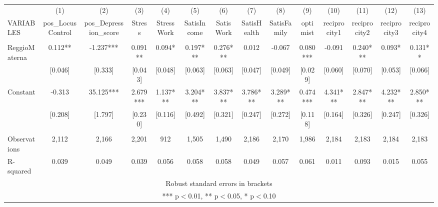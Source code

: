 \begin{tabular}{lccccccccccccc} \hline
 & (1) & (2) & (3) & (4) & (5) & (6) & (7) & (8) & (9) & (10) & (11) & (12) & (13) \\
VARIABLES & pos\_LocusControl & pos\_Depression\_score & Stress & StressWork & SatisIncome & SatisWork & SatisHealth & SatisFamily & optimist & reciprocity1 & reciprocity2 & reciprocity3 & reciprocity4 \\ \hline
 &  &  &  &  &  &  &  &  &  &  &  &  &  \\
ReggioMaterna & 0.112** & -1.237*** & 0.091** & 0.094* & 0.197*** & 0.276*** & 0.012 & -0.067 & 0.080*** & -0.091 & 0.240*** & 0.093* & 0.131** \\
 & [0.046] & [0.333] & [0.043] & [0.048] & [0.063] & [0.063] & [0.047] & [0.049] & [0.029] & [0.060] & [0.070] & [0.053] & [0.066] \\
Constant & -0.313 & 35.125*** & 2.679*** & 1.137*** & 3.204*** & 3.837*** & 3.786*** & 3.289*** & 0.474*** & 4.341*** & 2.847*** & 4.232*** & 2.850*** \\
 & [0.208] & [1.797] & [0.230] & [0.116] & [0.492] & [0.321] & [0.247] & [0.272] & [0.118] & [0.164] & [0.326] & [0.247] & [0.326] \\
 &  &  &  &  &  &  &  &  &  &  &  &  &  \\
Observations & 2,112 & 2,166 & 2,201 & 912 & 1,505 & 1,490 & 2,186 & 2,170 & 1,986 & 2,184 & 2,183 & 2,184 & 2,183 \\
 R-squared & 0.039 & 0.049 & 0.039 & 0.056 & 0.058 & 0.058 & 0.049 & 0.057 & 0.061 & 0.011 & 0.093 & 0.015 & 0.055 \\ \hline
\multicolumn{14}{c}{ Robust standard errors in brackets} \\
\multicolumn{14}{c}{ *** p$<$0.01, ** p$<$0.05, * p$<$0.10} \\
\end{tabular}
